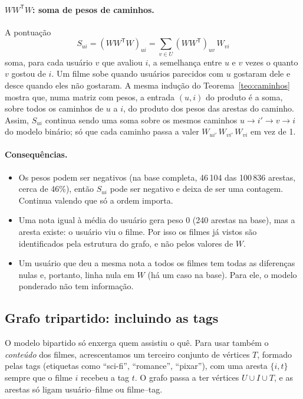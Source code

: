 \documentclass[12pt,a4paper]{article}
\theoremstyle{definition}
\begin{document}
\paragraph{$WW^{\mathsf T}W$: soma de pesos de caminhos.}
A pontuação
\[
  S_{ui} = (WW^{\mathsf T}W)_{ui} = \sum_{v \in U} (WW^{\mathsf T})_{uv}\, W_{vi}
\]
soma, para cada usuário $v$ que avaliou $i$, a semelhança entre $u$ e $v$
vezes o quanto $v$ gostou de $i$. Um filme sobe quando usuários parecidos
com $u$ gostaram dele e desce quando eles não gostaram. A mesma indução do
Teorema~\ref{teo:caminhos} mostra que, numa matriz com pesos, a entrada
$(u, i)$ do produto é a soma, sobre todos os caminhos de $u$ a $i$, do
produto dos pesos das arestas do caminho. Assim, $S_{ui}$ continua sendo
uma soma sobre os mesmos caminhos $u \to i' \to v \to i$ do modelo
binário; só que cada caminho passa a valer
$W_{ui'}\,W_{vi'}\,W_{vi}$ em vez de 1.

\paragraph{Consequências.}
\begin{itemize}
  \item Os pesos podem ser negativos (na base completa, 46\,104 das
        100\,836 arestas, cerca de 46\%), então $S_{ui}$ pode ser negativo e deixa de ser uma
        contagem. Continua valendo que só a ordem importa.
  \item Uma nota igual à média do usuário gera peso 0 (240 arestas na
        base), mas a aresta existe: o usuário viu o filme. Por isso os
        filmes já vistos são identificados pela estrutura do grafo, e não
        pelos valores de $W$.
  \item Um usuário que deu a mesma nota a todos os filmes tem todas as
        diferenças nulas e, portanto, linha nula em $W$ (há um caso na
        base). Para ele, o modelo ponderado não tem informação.
\end{itemize}

\subsection{Grafo tripartido: incluindo as tags}\label{sec:tripartido}

O modelo bipartido só enxerga quem assistiu o quê. Para usar também o
\emph{conteúdo} dos filmes, acrescentamos um terceiro conjunto de vértices
$T$, formado pelas tags (etiquetas como ``sci-fi'', ``romance'',
``pixar''), com uma aresta $\{i, t\}$ sempre que o filme $i$ recebeu a
tag $t$. O grafo passa a ter vértices $U \cup I \cup T$, e as arestas só
ligam usuário--filme ou filme--tag.
\end{document}

